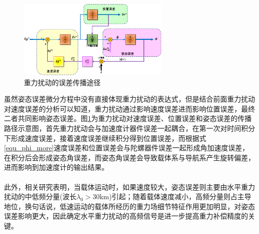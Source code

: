 \documentclass[12pt,a4,utf8]{article}
\newcommand{\upcite}[1]{\textsuperscript{\textsuperscript{\cite{#1}}}} %
\begin{document}
\begin{figure}[h]
      \centering
      \includegraphics[width=0.65\textwidth]{figure/fig_error_sep-crop.pdf}
      \caption{\label{fig:error_sep}重力扰动的误差传播途径}
\end{figure}

虽然姿态误差微分方程中没有直接体现重力扰动的表达式，但是结合前面重力扰动对速度误差的分析可以知道，重力扰动通过影响速度误差进而影响位置误差，最终二者共同影响姿态误差。图\ref{fig:error_sep}为重力扰动对速度误差、位置误差和姿态误差的传播路径示意图，首先重力扰动会与加速度计器件误差一起耦合，在第一次对时间积分下形成速度误差，接着速度误差继续积分得到位置误差，而根据式\ref{equ_phi_more}速度误差和位置误差会与陀螺器件误差一起形成角加速度误差，在积分后会形成姿态角误差，而姿态角误差会导致载体系与导航系产生旋转偏差，进而影响到加速度计的输出结果。

此外，相关研究表明\upcite{jekeli1994airborne,1020386196.nh,harriman1986gravity,Zhangpanpan23}，当载体运动时，如果速度较大，姿态误差则主要由水平重力扰动的中低频分量(波长$\lambda_0>30$km)引起；随着载体速度减小，高频分量则占主导地位，换句话说，低速运动的载体所经历的重力场细节特征作用更加明显，对姿态误差影响更大，因此确定水平重力扰动的高频信号是进一步提高重力补偿精度的关键。
\end{document}
